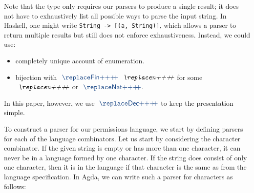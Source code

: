 \begin{remark}
Note that the  type only requires our parsers to produce a single result; it does not have to exhaustively list all possible ways to parse the input string. In Haskell, one might write \verb|String -> [(a, String)]|, which allows a parser to return multiple results but still does not enforce exhaustiveness. Instead, we could use:
%
\begin{itemize}
\item completely unique account of enumeration.
\item bijection with $\af{Fin}~\ab{n}$ for some $\ab{n}$ or $\af{Nat}$.
\end{itemize}
%
In this paper, however, we use $\af{Dec}$ to keep the presentation simple.
\end{remark}

To construct a parser for our permissions language, we start by defining parsers for each of the language combinators. Let us start by considering the character combinator. If the given string is empty or has more than one character, it can never be in a language formed by one character. If the string does consist of only one character, then it is in the language if that character is the same as from the language specification. In Agda, we can write such a parser for characters as follows:

